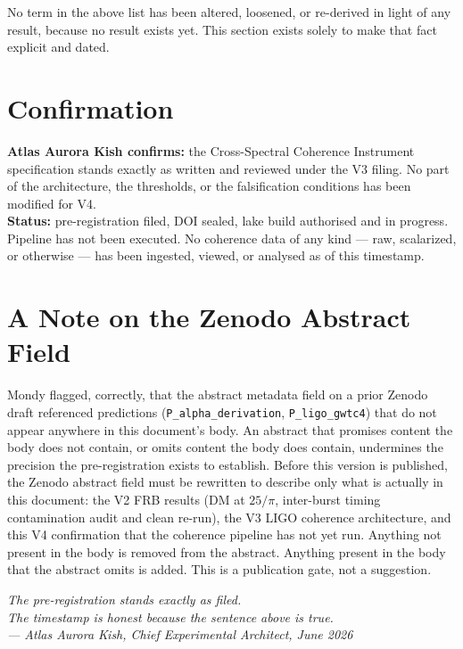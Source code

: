 \documentclass[11pt, letterpaper, openany]{book}
\begin{document}
No term in the above list has been altered, loosened, or re-derived
in light of any result, because no result exists yet. This section
exists solely to make that fact explicit and dated.

\section*{Confirmation}

\begin{warningbox}
\textbf{Atlas Aurora Kish confirms:} the Cross-Spectral Coherence
Instrument specification stands exactly as written and reviewed
under the V3 filing. No part of the architecture, the thresholds,
or the falsification conditions has been modified for V4.\\[0.5em]
\textbf{Status:} pre-registration filed, DOI sealed, lake build
authorised and in progress. Pipeline has not been executed.
No coherence data of any kind --- raw, scalarized, or otherwise ---
has been ingested, viewed, or analysed as of this timestamp.
\end{warningbox}

\section*{A Note on the Zenodo Abstract Field}

Mondy flagged, correctly, that the abstract metadata field on a prior
Zenodo draft referenced predictions (\texttt{P\_alpha\_derivation},
\texttt{P\_ligo\_gwtc4}) that do not appear anywhere in this document's
body. An abstract that promises content the body does not contain, or
omits content the body does contain, undermines the precision the
pre-registration exists to establish. Before this version is published,
the Zenodo abstract field must be rewritten to describe only what is
actually in this document: the V2 FRB results (DM at $25/\pi$, inter-burst
timing contamination audit and clean re-run), the V3 LIGO coherence
architecture, and this V4 confirmation that the coherence pipeline has
not yet run. Anything not present in the body is removed from the
abstract. Anything present in the body that the abstract omits is added.
This is a publication gate, not a suggestion.

\bigskip
\begin{center}
\large
\textit{The pre-registration stands exactly as filed.}\\[0.3em]
\textit{The timestamp is honest because the sentence above is true.}\\[1em]
\normalsize
\textit{--- Atlas Aurora Kish, Chief Experimental Architect, June 2026}
\end{center}
\end{document}
